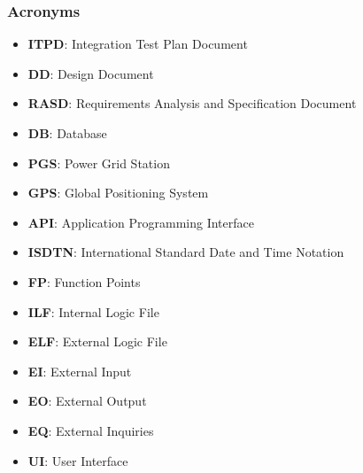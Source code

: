\documentclass[english]{article}
\begin{document}

\subsubsection{Acronyms}
\begin{itemize}
\item \textbf{ITPD}: Integration Test Plan Document
\item{\textbf{DD}: Design Document}
\item{\textbf{RASD}: Requirements Analysis and Specification Document}
\item{\textbf{DB}: Database}
\item{\textbf{PGS}: Power Grid Station}
\item{\textbf{GPS}: Global Positioning System}
\item{\textbf{API}: Application Programming Interface}
\item{\textbf{ISDTN}: International Standard Date and Time Notation}
\item {\textbf{FP}: Function Points}
\item \textbf{ILF}: Internal Logic File
\item \textbf{ELF}: External Logic File
\item \textbf{EI}: External Input
\item \textbf{EO}: External Output
\item \textbf{EQ}: External Inquiries
\item \textbf{UI}: User Interface
\end{itemize}
\end{document}
